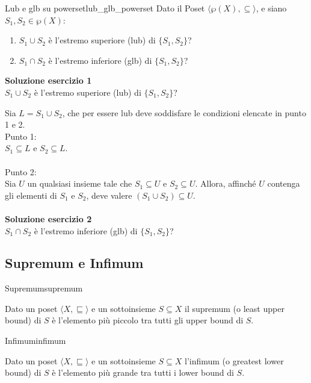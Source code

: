 \begin{esercizio}{Lub e glb su powerset}{lub_glb_powerset}
Dato il Poset $\langle \wp(X), \subseteq \rangle$, e siano $S_{1},S_{2}\in \wp(X)$:
\begin{enumerate}
    \item $S_{1}\cup S_{2}$ è l'estremo superiore (lub) di $\{S_{1},S_{2}\}$?
    \item $S_{1}\cap S_{2}$ è l'estremo inferiore (glb) di $\{S_{1},S_{2}\}$?
\end{enumerate}

\textbf{Soluzione esercizio 1}\\
$S_{1}\cup S_{2}$ è l'estremo superiore (lub) di $\{S_{1},S_{2}\}$?

Sia $L = S_1 \cup S_2$, che per essere lub deve soddisfare le condizioni elencate
in  punto 1 e 2.\\
Punto 1:\\
$S_1 \subseteq L$ e $S_2 \subseteq L$.\\
\\
Punto 2:\\
Sia $U$ un qualsiasi insieme tale che $S_1 \subseteq U$ e $S_2 \subseteq U$.
Allora, affinché $U$ contenga gli elementi di $S_1$ e $S_2$, deve valere
$(S_1 \cup S_2) \subseteq U$.\\
\\
\textbf{Soluzione esercizio 2}\\
$S_{1}\cap S_{2}$ è l'estremo inferiore (glb) di $\{S_{1},S_{2}\}$?

\end{esercizio}
\subsection{Supremum e Infimum}

\begin{definizione}{Supremum}{supremum}

Dato un poset $\langle X, \sqsubseteq \rangle$ e un sottoinsieme $S \subseteq X$
il supremum (o least upper bound) di $S$ è l'elemento più piccolo tra tutti gli
upper bound di $S$.

\end{definizione}

\begin{definizione}{Infimum}{infimum}

Dato un poset $\langle X, \sqsubseteq \rangle$ e un sottoinsieme $S \subseteq X$
l'infimum (o greatest lower bound) di $S$ è l'elemento più grande tra tutti i
lower bound di $S$.

\end{definizione}

